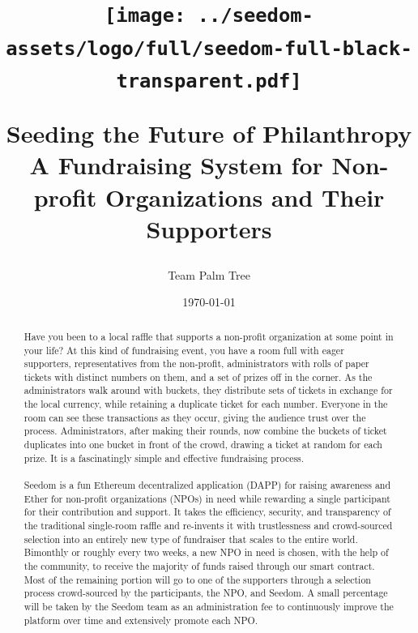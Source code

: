 \documentclass[11pt]{article}
\begin{document}
\title{%
\begin{center}
\texttt{[image: ../seedom-assets/logo/full/seedom-full-black-transparent.pdf]}
\end{center}
\large Seeding the Future of Philanthropy \\[5mm]
\large A Fundraising System for Non-profit Organizations and Their Supporters \\[5mm]}
\author{Team Palm Tree}
\date{\today}
\maketitle

\begin{abstract}

Have you been to a local raffle that supports a non-profit organization at some point in your life? At this kind of fundraising event, you have a room full with eager supporters, representatives from the non-profit, administrators with rolls of paper tickets with distinct numbers on them, and a set of prizes off in the corner. As the administrators walk around with buckets, they distribute sets of tickets in exchange for the local currency, while retaining a duplicate ticket for each number. Everyone in the room can see these transactions as they occur, giving the audience trust over the process. Administrators, after making their rounds, now combine the buckets of ticket duplicates into one bucket in front of the crowd, drawing a ticket at random for each prize. It is a fascinatingly simple and effective fundraising process.\\\\
Seedom is a fun Ethereum decentralized application (DAPP) for raising awareness and Ether for non-profit organizations (NPOs) in need while rewarding a single participant for their contribution and support. It takes the efficiency, security, and transparency of the traditional single-room raffle and re-invents it with trustlessness and crowd-sourced selection into an entirely new type of fundraiser that scales to the entire world. Bimonthly or roughly every two weeks, a new NPO in need is chosen, with the help of the community, to receive the majority of funds raised through our smart contract. Most of the remaining portion will go to one of the supporters through a selection process crowd-sourced by the participants, the NPO, and Seedom. A small percentage will be taken by the Seedom team as an administration fee to continuously improve the platform over time and extensively promote each NPO.

\end{abstract}
\pagebreak
\end{document}
